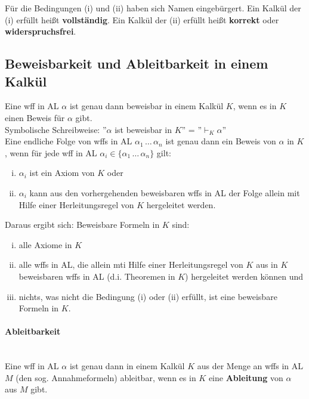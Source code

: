 \documentclass{scrartcl}
\begin{document}
Für die Bedingungen (i) und (ii) haben sich Namen eingebürgert. Ein Kalkül der (i) erfüllt heißt \textbf{vollständig}. Ein Kalkül der (ii) erfüllt heißt \textbf{korrekt} oder \textbf{widerspruchsfrei}.

\subsection{Beweisbarkeit und Ableitbarkeit in einem Kalkül}

Eine wff in AL $ \alpha $ ist genau dann beweisbar in einem Kalkül $ K $, wenn es in $ K $ einen Beweis für $ \alpha $ gibt. \\

Symbolische Schreibweise: ''$ \alpha $ ist beweisbar in $ K $'' = ''$ \vdash_K \alpha $'' \\

Eine endliche Folge von wffs in AL $ \alpha_1 \, \ldots \, \alpha_n $ ist genau dann ein Beweis von $ \alpha $ in $ K $, wenn für jede wff in AL $ \alpha_i \in \{ \alpha_1 \, \ldots \, \alpha_n\} $ gilt:
\begin{enumerate}[(i)]
	\item $ \alpha_i $ ist ein Axiom von $ K $ oder
	\item $ \alpha_i $ kann aus den vorhergehenden beweisbaren wffs in AL der Folge allein mit Hilfe einer Herleitungsregel von $ K $ hergeleitet werden.
\end{enumerate}

Daraus ergibt sich: Beweisbare Formeln in $ K $ sind:
\begin{enumerate}[(i)]
	\item alle Axiome in $ K $
	\item alle wffs in AL, die allein mti Hilfe einer Herleitungsregel von $ K $ aus in $ K $ beweisbaren wffs in AL (d.i. Theoremen in $ K $) hergeleitet werden können und
	\item nichts, was nicht die Bedingung (i) oder (ii) erfüllt, ist eine beweisbare Formeln in $ K $.
\end{enumerate}

\paragraph{Ableitbarkeit} \mbox{}\\

Eine wff in AL $ \alpha $ ist genau dann in einem Kalkül $ K $ aus der Menge an wffs in AL $ M $ (den sog. Annahmeformeln) ableitbar, wenn es in $ K $ eine \textbf{Ableitung} von $ \alpha $ aus $ M $ gibt. \\
\end{document}
